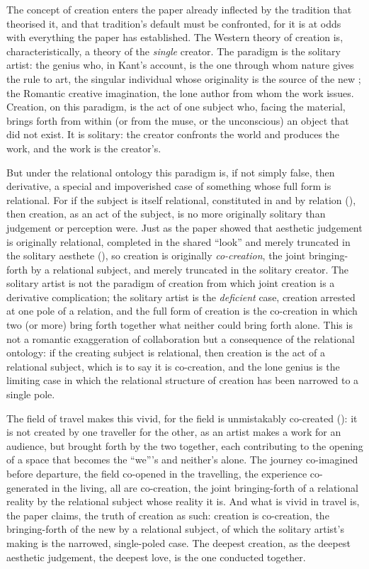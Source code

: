 The concept of creation enters the paper already inflected by the tradition that theorised it, and that tradition's default must be confronted, for it is at odds with everything the paper has established. The Western theory of creation is, characteristically, a theory of the \emph{single} creator. The paradigm is the solitary artist: the genius who, in Kant's account, is the one through whom nature gives the rule to art, the singular individual whose originality is the source of the new \parencite{kant1987}; the Romantic creative imagination, the lone author from whom the work issues. Creation, on this paradigm, is the act of one subject who, facing the material, brings forth from within (or from the muse, or the unconscious) an object that did not exist. It is solitary: the creator confronts the world and produces the work, and the work is the creator's.

But under the relational ontology this paradigm is, if not simply false, then derivative, a special and impoverished case of something whose full form is relational. For if the subject is itself relational, constituted in and by relation (), then creation, as an act of the subject, is no more originally solitary than judgement or perception were. Just as the paper showed that aesthetic judgement is originally relational, completed in the shared ``look'' and merely truncated in the solitary aesthete (), so creation is originally \emph{co-creation}, the joint bringing-forth by a relational subject, and merely truncated in the solitary creator. The solitary artist is not the paradigm of creation from which joint creation is a derivative complication; the solitary artist is the \emph{deficient} case, creation arrested at one pole of a relation, and the full form of creation is the co-creation in which two (or more) bring forth together what neither could bring forth alone. This is not a romantic exaggeration of collaboration but a consequence of the relational ontology: if the creating subject is relational, then creation is the act of a relational subject, which is to say it is co-creation, and the lone genius is the limiting case in which the relational structure of creation has been narrowed to a single pole.

The field of travel makes this vivid, for the field is unmistakably co-created (): it is not created by one traveller for the other, as an artist makes a work for an audience, but brought forth by the two together, each contributing to the opening of a space that becomes the ``we'''s and neither's alone. The journey co-imagined before departure, the field co-opened in the travelling, the experience co-generated in the living, all are co-creation, the joint bringing-forth of a relational reality by the relational subject whose reality it is. And what is vivid in travel is, the paper claims, the truth of creation as such: creation is co-creation, the bringing-forth of the new by a relational subject, of which the solitary artist's making is the narrowed, single-poled case. The deepest creation, as the deepest aesthetic judgement, the deepest love, is the one conducted together.

